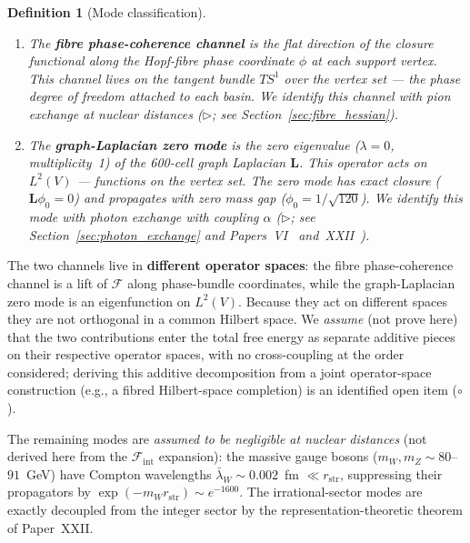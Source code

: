 \documentclass[12pt]{article}
\newtheorem{definition}[theorem]{Definition}
\newcommand{\Fcal}{\mathcal{F}}
\newcommand{\Fint}{\Fcal_{\mathrm{int}}}
\newcommand{\lbar}{\bar{\lambda}}
\begin{document}
\begin{definition}[Mode classification]\label{def:mode_classes}
\begin{enumerate}
    \item The \textbf{fibre phase-coherence channel} is the flat
    direction of the closure functional along the Hopf-fibre phase
    coordinate $\phi$ at each support vertex. This channel lives on
    the tangent bundle $TS^1$ over the vertex set --- the phase
    degree of freedom attached to each basin. We identify this
    channel with \textit{pion exchange} at nuclear distances
    ($\triangleright$; see Section~\ref{sec:fibre_hessian}).

    \item The \textbf{graph-Laplacian zero mode} is the zero
    eigenvalue ($\lambda = 0$, multiplicity~1) of the 600-cell graph
    Laplacian $\mathbf{L}$. This operator acts on $L^2(V)$ ---
    functions on the vertex set. The zero mode has exact closure
    ($\mathbf{L}\phi_0 = 0$) and propagates with zero mass gap
    ($\phi_0 = 1/\sqrt{120}$). We identify this mode with
    \textit{photon exchange} with coupling $\alpha$
    ($\triangleright$; see Section~\ref{sec:photon_exchange} and
    Papers~VI~\citep{SmartVI} and~XXII~\citep{SmartXXII}).
\end{enumerate}
\end{definition}

The two channels live in \textbf{different operator spaces}: the
fibre phase-coherence channel is a lift of $\Fcal$ along
phase-bundle coordinates, while the graph-Laplacian zero mode is an
eigenfunction on $L^2(V)$. Because they act on different spaces they are not orthogonal in a common Hilbert space. We \emph{assume} (not prove here) that the two contributions enter the total free energy as separate additive pieces on their respective operator spaces, with no cross-coupling at the order considered; deriving this additive decomposition from a joint operator-space construction (e.g., a fibred Hilbert-space completion) is an identified open item ($\circ$).

The remaining modes are \emph{assumed to be negligible at nuclear distances} (not derived here from the $\Fint$ expansion): the massive
gauge bosons ($m_W, m_Z \sim 80$--$91$~GeV) have Compton wavelengths
$\lbar_W \sim 0.002$~fm $\ll r_{\mathrm{str}}$, suppressing their
propagators by $\exp(-m_W r_{\mathrm{str}}) \sim e^{-1600}$. The
irrational-sector modes are exactly decoupled from the integer sector by
the representation-theoretic theorem of Paper~XXII.
\end{document}

